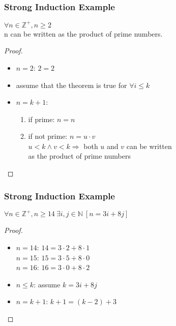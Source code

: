 \documentclass[dvipsnames]{beamer}
\begin{document}
\begin{frame}
  \frametitle{Strong Induction Example}

  \begin{theorem}
    $\forall n \in \mathbb{Z}^+, n \geq 2$\\
      n can be written as the product of prime numbers.
  \end{theorem}

  \pause
  \begin{proof}
    \begin{itemize}
      \item $n=2$: $2=2$

      \pause
      \item assume that the theorem is true for $\forall i \leq k$

      \pause
      \item $n=k+1$:
      \begin{enumerate}
        \item if prime: $n=n$

        \pause
        \item if not prime: $n=u \cdot v$\\
          $u < k \wedge v < k \Rightarrow$ both $u$ and $v$ can be written\\
          as the product of prime numbers
      \end{enumerate}
    \end{itemize}
  \end{proof}
\end{frame}

\begin{frame}
  \frametitle{Strong Induction Example}

  \begin{theorem}
    $\forall n \in \mathbb{Z}^+, n \geq 14~\exists i,j \in \mathbb{N}~[n=3i+8j]$
  \end{theorem}

  \pause
  \begin{proof}
    \begin{itemize}
      \item $n=14$: $14=3 \cdot 2 + 8 \cdot 1$\\
        $n=15$: $15=3 \cdot 5 + 8 \cdot 0$\\
        $n=16$: $16=3 \cdot 0 + 8 \cdot 2$

      \pause
      \item $n \leq k$: assume $k=3i+8j$

      \pause
      \item $n=k+1$: $k+1=(k-2)+3$
    \end{itemize}
  \end{proof}
\end{frame}
\end{document}
